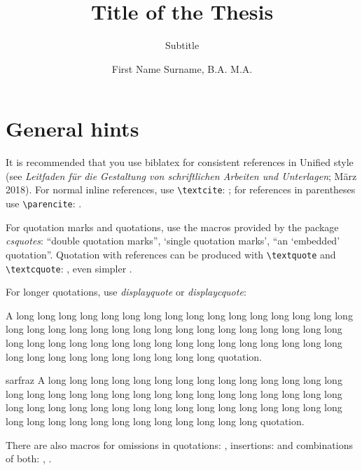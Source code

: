 \documentclass[naustrian,english]{univie-ling-thesis}
\author{First Name Surname, B.A. M.A.}
\title{Title of the Thesis}
\subtitle{Subtitle}
\begin{document}
\maketitle

\tableofcontents

\chapter{General hints}\label{cha:hints}

It is recommended that you use \textsf{biblatex} for consistent references in Unified style
(see \foreignlanguage{naustrian}{\emph{Leitfaden für die Gestaltung von schriftlichen Arbeiten und Unterlagen}; März 2018}).
For normal inline references, use \verb|\textcite|: \textcite[22]{sarfraz}; for references in parentheses use \verb|\parencite|: \parencite{sarfraz}.

For quotation marks and quotations, use the macros provided by the package \emph{csquotes}: \enquote{double quotation marks}, \enquote*{single quotation marks},
\enquote{an \enquote{embedded} quotation}. Quotation with references can be produced with \verb|\textquote| and \verb|\textcquote|:
, even simpler .

For longer quotations, use \emph{displayquote} or \emph{displaycquote}:

\begin{displayquote}
	A long long long long long long long long long long long long long long long long long long
	long long long long long long long long long long long long long long long long long long long long
	long long long long long long long long long long long long long long long long long long long long
	quotation.
\end{displayquote}

\begin{displaycquote}[246]{sarfraz}
	A long long long long long long long long long long long long long long long long long long
	long long long long long long long long long long long long long long long long long long long long
	long long long long long long long long long long long long long long long long long long long long
	quotation.
\end{displaycquote}
%
There are also macros for omissions in quotations: \textelp{}, insertions:  and combinations of both: ,
.
\end{document}
